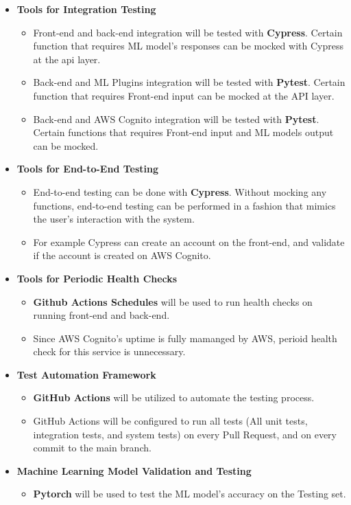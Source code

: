 \documentclass[12pt, titlepage]{article}
\begin{document}
\begin{itemize}
  \item[] {\textbf{Tools for Integration Testing}}
  \begin{itemize}
    \item{Front-end and back-end integration will be tested with \textbf{Cypress}. Certain function that requires ML model's responses can be mocked with Cypress at the api layer.}
    \item{Back-end and ML Plugins integration will be tested with \textbf{Pytest}. Certain function that requires Front-end input can be mocked at the API layer.}
    \item{Back-end and AWS Cognito integration will be tested with \textbf{Pytest}. Certain functions that requires Front-end input and ML models output can be mocked.}
  \end{itemize}

  \item[] {\textbf{Tools for End-to-End Testing}}
  \begin{itemize}
    \item{End-to-end testing can be done with \textbf{Cypress}. Without mocking any functions, end-to-end testing can be performed in a fashion that mimics the user's interaction with the system.}
    \item{For example Cypress can create an account on the front-end, and validate if the account is created on AWS Cognito.}
  \end{itemize}

  \item[] {\textbf{Tools for Periodic Health Checks}}
  \begin{itemize}
    \item{\textbf{Github Actions Schedules} will be used to run health checks on running front-end and back-end.}
    \item{Since AWS Cognito's uptime is fully mamanged by AWS, perioid health check for this service is unnecessary.}
  \end{itemize}

  \item[] {\textbf{Test Automation Framework}}
  \begin{itemize}
    \item{\textbf{GitHub Actions} will be utilized to automate the testing process.}
    \item{GitHub Actions will be configured to run all tests (All unit tests, integration tests, and system tests) on every Pull Request, and on every commit to the main branch.}
  \end{itemize}

  \item[] {\textbf{Machine Learning Model Validation and Testing}}
  \begin{itemize}
    \item{\textbf{Pytorch} will be used to test the ML model's accuracy on the Testing set.}
  \end{itemize}
\end{itemize}
\end{document}
